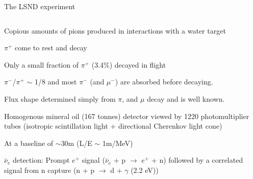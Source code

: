 \begin{frame}[t]{The LSND experiment}
\begin{columns}
\begin{column}{0.50\textwidth}
\begin{itemize}
{     \item Copious amounts of pions produced in interactions with a water target
     \item $\pi^{+}$ come to rest and decay
     \item Only a small fraction of $\pi^{+}$ (3.4\%) decayed in flight
     \item $\pi^{-}$/$\pi^{+}$ $\sim$ 1/8 and most $\pi^{-}$ (and $\mu^{-}$) are absorbed before decaying.
     \item Flux shape determined simply from $\pi$, and $\mu$ decay and is well known.
     \item Homogenous mineral oil (167 tonnes) detector viewed by 1220 photomultiplier tubes (isotropic scintillation light + directional Cherenkov light cone)
     \item At a baseline of $\sim$30m (L/E $\sim$ 1m/MeV)
     \item $\bar{\nu}_{e}$ detection: Prompt $e^{+}$ signal ({\color{red}$\bar{\nu}_{e}$ + p $\rightarrow$ $e^{+}$ + n})
           followed by a correlated signal from n capture ({\color{red}n + p $\rightarrow$ d + $\gamma$} (2.2 eV))\\
    }
    \end{itemize}
  \end{column}
\end{columns}

\end{frame}


